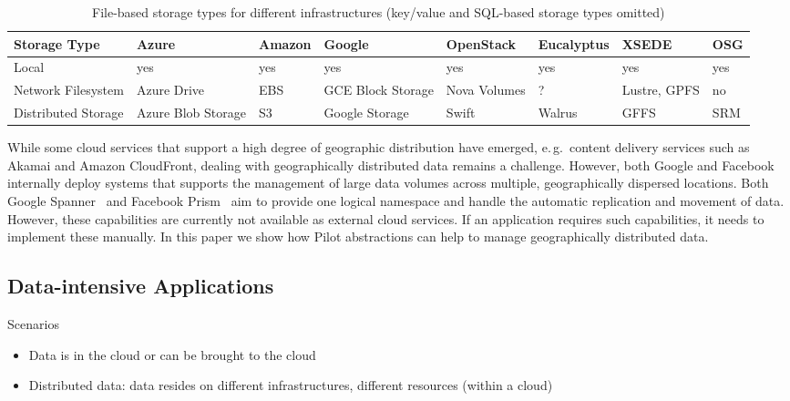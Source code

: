 \documentclass[times]{cpeauth}
\newcommand{\pilot}{Pilot\xspace}
\begin{document}
\begin{table}[t]
\centering
\begin{tabular}{|p{1.7cm}|p{1.3cm}|p{1.3cm}|p{1.3cm}|p{1.4cm}|p{1.4cm}|p{1.3cm}|p{1.2cm}|}
	\hline
	\textbf{Storage Type} &\textbf{Azure} &\textbf{Amazon} &\textbf{Google} &\textbf{Open\-Stack} &\textbf{Euca\-lyptus} &\textbf{XSEDE}  &\textbf{OSG} \\
	\hline
	Local	&yes &yes &yes &yes &yes &yes &yes\\
	\hline
	Network Filesystem &Azure Drive &EBS &GCE Block Storage &Nova Volumes &? &Lustre, GPFS 
	&no\\
	\hline
	Distributed Storage &Azure Blob Storage &S3 &Google Storage &Swift & Walrus &GFFS
	 &SRM\\
	\hline	
\end{tabular}
\caption{File-based storage types for different infrastructures (key/value and 
SQL-based storage types omitted) \label{tab:storage-systems}}
\end{table}


While some cloud services that support a high degree of geographic 
distribution have emerged, e.\,g.\ content delivery services such as Akamai 
and Amazon CloudFront, dealing with geographically distributed data remains a 
challenge. However, both Google and Facebook internally deploy systems that 
supports the management of large data volumes across multiple, geographically
dispersed locations. Both Google Spanner~\cite{dean09} and Facebook 
Prism~\cite{Metz12} aim to provide one logical namespace and handle the 
automatic replication and movement of data. However, these capabilities are 
currently not available as external cloud services. If an application requires 
such capabilities, it needs to implement these manually. In this paper we show 
how \pilot abstractions can help to manage geographically distributed data.


\subsection{Data-intensive Applications}

Scenarios
\begin{itemize}
	\item Data is in the cloud or can be brought to the cloud
	\item Distributed data: data resides on different infrastructures, different resources (within a cloud)
\end{itemize}
\end{document}
